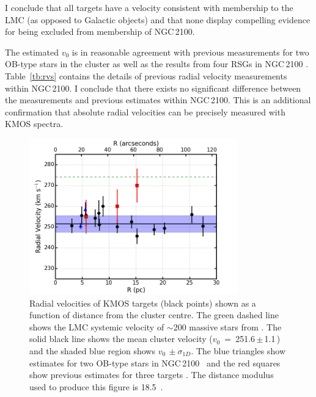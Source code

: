 I conclude that all targets have a velocity consistent with membership to the LMC (as opposed to Galactic objects) and that none display compelling evidence for being excluded from membership of NGC\,2100.

The estimated $v_0$ is in reasonable agreement with previous measurements for two OB-type stars in the cluster
\citep{2015A&A...584A...5E} as well as the results from four RSGs in NGC\,2100
\citep[henceforth JT94; three of which were observed in the current study]{1994A&A...282..717J}.
Table~\ref{tb:rvs} contains the details of previous radial velocity measurements within NGC\,2100.
I conclude that there exists no significant difference between the measurements and previous estimates within NGC\,2100.
This is an additional confirmation that absolute radial velocities can be precisely measured with KMOS spectra.

\begin{figure}
 \centering
 \includegraphics[width=9.0cm]{ngc2100/NGC2100-rv-v10}
 \caption[KMOS radial velocites in NGC\,2100]{Radial velocities of KMOS targets (black points) shown as a function of distance from the cluster centre.
The green dashed line shows the LMC systemic velocity of $\sim$200 massive stars from
 {\protect\citep[274.1\,$\pm$\,16.4\,\kms;][]{2015A&A...584A...5E}}.
 The solid black line shows the mean cluster velocity ($v_0$~=~251.6\,$\pm$\,1.1\,\kms) and the shaded blue region shows $v_0\,\pm\sigma_{1D}$.
 The blue triangles show estimates for two OB-type stars in NGC\,2100~\protect\citep{2015A&A...584A...5E} and the red squares show previous estimates for three targets
 {\citep{1994A&A...282..717J}}.
 The distance modulus used to produce this figure is 18.5~\citep{2013Natur.495...76P,2014AJ....147..122D}.
 \label{fig:rvs}}
\end{figure}

